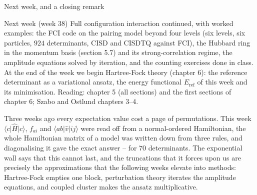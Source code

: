 \documentclass[aspectratio=169,10pt]{beamer}
\newcommand{\ket}[1]{\vert #1\rangle}
\newcommand{\bra}[1]{\langle #1\vert}
\newcommand{\element}[3]{\langle #1\vert #2\vert #3\rangle}
\begin{document}
\begin{frame}{Next week, and a closing remark}
  \begin{exampleblock}{Next week (week 38)}
    Full configuration interaction continued, with worked examples: the FCI code on the pairing model beyond four levels (six levels, six particles, $924$ determinants, CISD and CISDTQ against FCI), the Hubbard ring in the momentum basis (section 5.7) and its strong-correlation regime, the amplitude equations solved by iteration, and the counting exercises done in class. At the end of the week we begin Hartree-Fock theory (chapter 6): the reference determinant as a variational ansatz, the energy functional $E_{\mathrm{ref}}$ of this week and its minimisation. Reading: chapter 5 (all sections) and the first sections of chapter 6; Szabo and Ostlund chapters 3--4.
  \end{exampleblock}
  \vspace{0.5em}
  Three weeks ago every expectation value cost a page of permutations. This week $\bra{c}\hat{H}\ket{c}$, $f_{ai}$ and $\element{ab}{\hat{v}}{ij}$ were read off from a normal-ordered Hamiltonian, the whole Hamiltonian matrix of a model was written down from three rules, and diagonalising it gave the exact answer -- for $70$ determinants. The exponential wall says that this cannot last, and the truncations that it forces upon us are precisely the approximations that the following weeks elevate into methods: Hartree-Fock empties one block, perturbation theory iterates the amplitude equations, and coupled cluster makes the ansatz multiplicative.
\end{frame}
\end{document}

